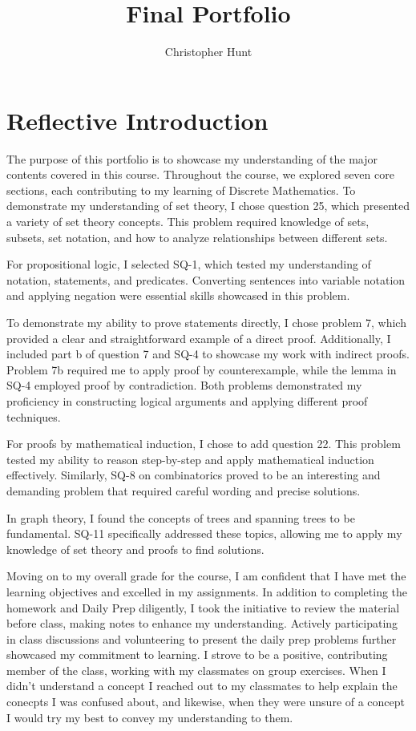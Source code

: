 \documentclass{article}
\title{Final Portfolio}
\author{Christopher Hunt}
\date{}
\begin{document}
\pagestyle{fancy}
\fancyhf{}
\rhead{\thepage}
\maketitle

\section*{Reflective Introduction}
The purpose of this portfolio is to showcase my understanding of the major contents covered in this course. Throughout the course, we explored seven core sections, each contributing to my learning of Discrete Mathematics. To demonstrate my understanding of set theory, I chose question 25, which presented a variety of set theory concepts. This problem required knowledge of sets, subsets, set notation, and how to analyze relationships between different sets.

For propositional logic, I selected SQ-1, which tested my understanding of notation, statements, and predicates. Converting sentences into variable notation and applying negation were essential skills showcased in this problem.

To demonstrate my ability to prove statements directly, I chose problem 7, which provided a clear and straightforward example of a direct proof. Additionally, I included part b of question 7 and SQ-4 to showcase my work with indirect proofs. Problem 7b required me to apply proof by counterexample, while the lemma in SQ-4 employed proof by contradiction. Both problems demonstrated my proficiency in constructing logical arguments and applying different proof techniques.

For proofs by mathematical induction, I chose to add question 22. This problem tested my ability to reason step-by-step and apply mathematical induction effectively. Similarly, SQ-8 on combinatorics proved to be an interesting and demanding problem that required careful wording and precise solutions.

In graph theory, I found the concepts of trees and spanning trees to be fundamental. SQ-11 specifically addressed these topics, allowing me to apply my knowledge of set theory and proofs to find solutions.

Moving on to my overall grade for the course, I am confident that I have met the learning objectives and excelled in my assignments. In addition to completing the homework and Daily Prep diligently, I took the initiative to review the material before class, making notes to enhance my understanding. Actively participating in class discussions and volunteering to present the daily prep problems further showcased my commitment to learning. I strove to be a positive, contributing member of the class, working with my classmates on group exercises. When I didn't understand a concept I reached out to my classmates to help explain the conecpts I was confused about, and likewise, when they were unsure of a concept I would try my best to convey my understanding to them. 
\end{document}
